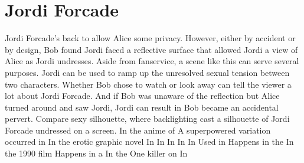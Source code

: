 \documentclass[12pt]{book}
\begin{document}
\chapter{Jordi Forcade}

Jordi Forcade's back to allow Alice some privacy. However, either by accident or by design, Bob found Jordi faced a reflective surface that allowed Jordi a view of Alice as Jordi undresses. Aside from fanservice, a scene like this can serve several purposes. Jordi can be used to ramp up the unresolved sexual tension between two characters. Whether Bob chose to watch or look away can tell the viewer a lot about Jordi Forcade. And if Bob was unaware of the reflection but Alice turned around and saw Jordi, Jordi can result in Bob became an accidental pervert. Compare sexy silhouette, where backlighting cast a silhouette of Jordi Forcade undressed on a screen. In the anime of A superpowered variation occurred in In the erotic graphic novel In In In In In Used in Happens in the In the 1990 film Happens in a In the One killer on In
\end{document}
